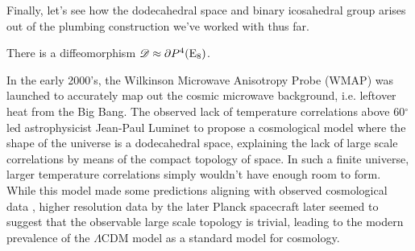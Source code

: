 Finally, let's see how the dodecahedral space and binary icosahedral group arises out of the plumbing construction we've worked with thus far.


\begin{proposition}
	There is a diffeomorphism $\mathscr{D}\approx \partial P^4({\operatorname{E}}_8)$.
\end{proposition}


\begin{remark}
	In the early 2000's, the Wilkinson Microwave Anisotropy Probe (WMAP) was launched to accurately map out the cosmic microwave background, i.e. leftover heat from the Big Bang. The observed lack of temperature correlations above 60$^\circ$ led astrophysicist Jean-Paul Luminet to propose a cosmological model \cite{luminet2003dodecahedral} where the shape of the universe is a dodecahedral space, explaining the lack of large scale correlations by means of the compact topology of space. In such a finite universe, larger temperature correlations simply wouldn't have enough room to form.
	While this model made some predictions aligning with observed cosmological data
	\cite{roukema2008dodecahedral}, higher resolution data by the later Planck spacecraft later seemed to suggest that the observable large scale topology is trivial, leading to the modern prevalence of the $\Lambda$CDM model as a standard model for cosmology.
\end{remark}
